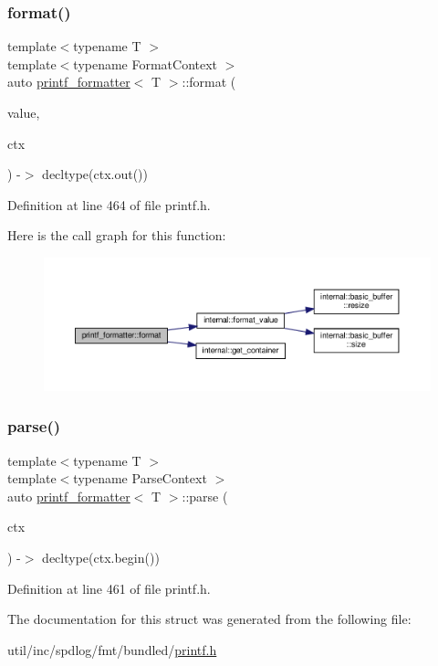 \subsubsection{\texorpdfstring{format()}{format()}}
{\footnotesize\ttfamily template$<$typename T $>$ \\
template$<$typename Format\+Context $>$ \\
auto \hyperlink{structprintf__formatter}{printf\+\_\+formatter}$<$ T $>$\+::format (\begin{DoxyParamCaption}\item[{const T \&}]{value,  }\item[{Format\+Context \&}]{ctx }\end{DoxyParamCaption}) -\/$>$ decltype(ctx.\+out()) \hspace{0.3cm}{\ttfamily [inline]}}



Definition at line 464 of file printf.\+h.

Here is the call graph for this function\+:
\nopagebreak
\begin{figure}[H]
\begin{center}
\leavevmode
\includegraphics[width=350pt]{structprintf__formatter_a339e8b7c2916129b1e1001bfd68fe584_cgraph}
\end{center}
\end{figure}
\mbox{\label{structprintf__formatter_ad4ca7b204b381a7fdb7c4a94952217b3}} 
\subsubsection{\texorpdfstring{parse()}{parse()}}
{\footnotesize\ttfamily template$<$typename T $>$ \\
template$<$typename Parse\+Context $>$ \\
auto \hyperlink{structprintf__formatter}{printf\+\_\+formatter}$<$ T $>$\+::parse (\begin{DoxyParamCaption}\item[{Parse\+Context \&}]{ctx }\end{DoxyParamCaption}) -\/$>$ decltype(ctx.\+begin()) \hspace{0.3cm}{\ttfamily [inline]}}



Definition at line 461 of file printf.\+h.



The documentation for this struct was generated from the following file\+:\begin{DoxyCompactItemize}
\item 
util/inc/spdlog/fmt/bundled/\hyperlink{printf_8h}{printf.\+h}\end{DoxyCompactItemize}
